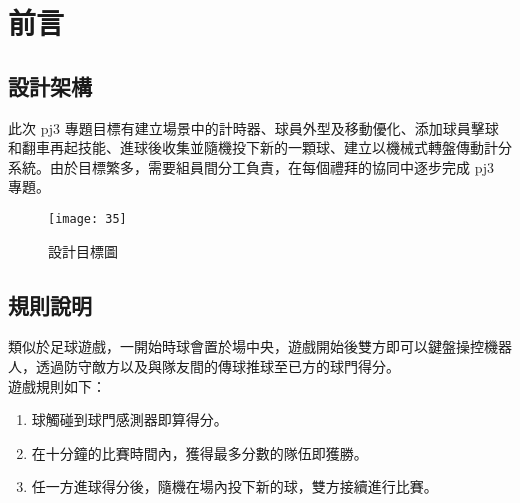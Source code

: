 \chapter{前言}
\renewcommand{\baselinestretch}{10.0} %
\setcounter{page}{1}  %
\fontsize{14pt}{2.5pt}\sectionef
\section{設計架構}
此次 pj3 專題目標有建立場景中的計時器、球員外型及移動優化、添加球員擊球和翻車再起技能、進球後收集並隨機投下新的一顆球、建立以機械式轉盤傳動計分系統。由於目標繁多，需要組員間分工負責，在每個禮拜的協同中逐步完成 pj3 專題。\\

\begin{figure}[hbt!]
\begin{center}
\texttt{[image: 35]}
\caption{\Large 設計目標圖}\label{fig.35}
\end{center}
\end{figure}
\section{規則說明}
類似於足球遊戲，一開始時球會置於場中央，遊戲開始後雙方即可以鍵盤操控機器人，透過防守敵方以及與隊友間的傳球推球至已方的球門得分。\\
遊戲規則如下：
\begin{enumerate}
\item 球觸碰到球門感測器即算得分。
\item 在十分鐘的比賽時間內，獲得最多分數的隊伍即獲勝。
\item 任一方進球得分後，隨機在場內投下新的球，雙方接續進行比賽。
\end{enumerate}

\renewcommand{\baselinestretch}{0.5} %